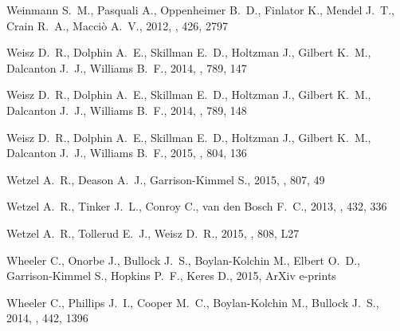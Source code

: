 \documentclass[usenatbib]{mn2e}
\begin{document}
\begin{thebibliography}{157}
{Weinmann} S.~M., {Pasquali} A., {Oppenheimer} B.~D., {Finlator} K., {Mendel}
  J.~T., {Crain} R.~A., {Macci{\`o}} A.~V., 2012, \mnras, 426, 2797

{Weisz} D.~R., {Dolphin} A.~E., {Skillman} E.~D., {Holtzman} J., {Gilbert}
  K.~M., {Dalcanton} J.~J., {Williams} B.~F., 2014{}, \apj, 789,
  147

{Weisz} D.~R., {Dolphin} A.~E., {Skillman} E.~D., {Holtzman} J., {Gilbert}
  K.~M., {Dalcanton} J.~J., {Williams} B.~F., 2014{}, \apj, 789,
  148

{Weisz} D.~R., {Dolphin} A.~E., {Skillman} E.~D., {Holtzman} J., {Gilbert}
  K.~M., {Dalcanton} J.~J., {Williams} B.~F., 2015, \apj, 804, 136

{Wetzel} A.~R., {Deason} A.~J., {Garrison-Kimmel} S., 2015, \apj, 807, 49

{Wetzel} A.~R., {Tinker} J.~L., {Conroy} C., {van den Bosch} F.~C., 2013,
  \mnras, 432, 336

{Wetzel} A.~R., {Tollerud} E.~J., {Weisz} D.~R., 2015, \apjl, 808, L27

{Wheeler} C., {Onorbe} J., {Bullock} J.~S., {Boylan-Kolchin} M., {Elbert}
  O.~D., {Garrison-Kimmel} S., {Hopkins} P.~F., {Keres} D., 2015, ArXiv
  e-prints

{Wheeler} C., {Phillips} J.~I., {Cooper} M.~C., {Boylan-Kolchin} M., {Bullock}
  J.~S., 2014, \mnras, 442, 1396


\end{thebibliography}
\end{document}
